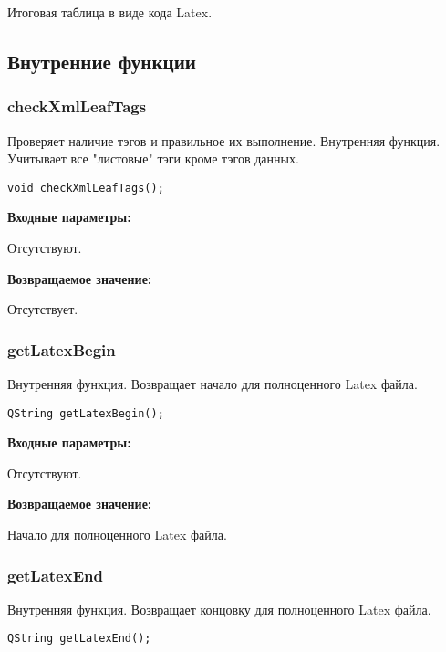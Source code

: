 \documentclass[a4paper,12pt]{article}
\begin{document}
Итоговая таблица в виде кода Latex.


\subsection{Внутренние функции}

\subsubsection{checkXmlLeafTags}\label{checkXmlLeafTags}

Проверяет наличие тэгов и правильное их выполнение. Внутренняя функция. Учитывает все "листовые" тэги кроме тэгов данных.


\begin{lstlisting}[label=code_syntax_checkXmlLeafTags,caption=Синтаксис]
void checkXmlLeafTags();
\end{lstlisting}

\textbf{Входные параметры:}

Отсутствуют.

\textbf{Возвращаемое значение:}

Отсутствует.


\subsubsection{getLatexBegin}\label{getLatexBegin}

Внутренняя функция. Возвращает начало для полноценного Latex файла.


\begin{lstlisting}[label=code_syntax_getLatexBegin,caption=Синтаксис]
QString getLatexBegin();
\end{lstlisting}

\textbf{Входные параметры:}

Отсутствуют.

\textbf{Возвращаемое значение:}

Начало для полноценного Latex файла.


\subsubsection{getLatexEnd}\label{getLatexEnd}

Внутренняя функция. Возвращает концовку для полноценного Latex файла.


\begin{lstlisting}[label=code_syntax_getLatexEnd,caption=Синтаксис]
QString getLatexEnd();
\end{lstlisting}
\end{document}
